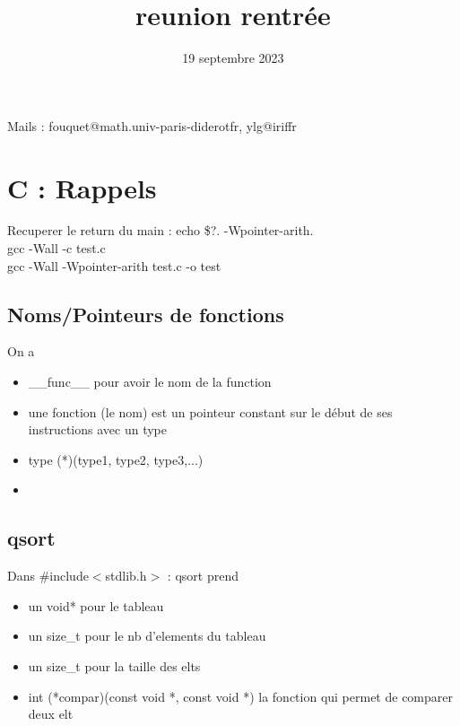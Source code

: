 \documentclass[12pt]{article}
\title{reunion rentrée}
\date{19 septembre 2023}
\begin{document}
\maketitle

Mails : fouquet@math.univ-paris-diderotfr, ylg@iriffr 

\section{C : Rappels}
Recuperer le return du main : echo \$?. -Wpointer-arith.\\
gcc -Wall -c test.c\\
gcc -Wall -Wpointer-arith test.c -o test


\subsection{Noms/Pointeurs de fonctions}
On a 
\begin{itemize}
    \item \_\_func\_\_ pour avoir le nom de la function
    \item une fonction (le nom) est un pointeur constant sur le début de ses instructions avec un type 
    \item type (*)(type1, type2, type3,...)
    \item 
\end{itemize}

\subsection{qsort}
Dans \#include$<$stdlib.h$>$ : qsort prend
\begin{itemize}
    \item un void* pour le tableau
    \item un size\_t pour le nb d'elements du tableau
    \item un size\_t pour la taille des elts
    \item int (*compar)(const void *, const void *) la fonction qui permet de comparer deux elt
\end{itemize} 
\end{document}
